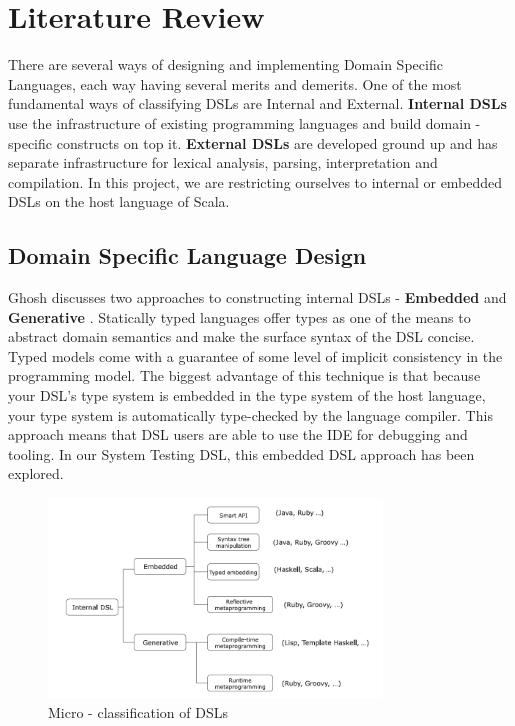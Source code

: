 \documentclass[12 pt]{article}
\begin{document}
\newpage
\section{Literature Review}
There are several ways of designing and implementing Domain Specific Languages, each way having several merits and demerits. One of the most fundamental ways of classifying DSLs are Internal and External. \textbf{Internal DSLs} use the infrastructure of existing programming languages and build domain - specific constructs on top it. \textbf{External DSLs} are developed ground up and has separate infrastructure for lexical analysis, parsing, interpretation and compilation. In this project, we are restricting ourselves to internal or embedded DSLs on the host language of Scala.
\bigskip

\subsection{Domain Specific Language Design}
Ghosh discusses two approaches to constructing internal DSLs - \textbf{Embedded} and \textbf{Generative} \cite{dslsInAction}. Statically typed languages offer types as one of the means to abstract domain semantics and make the surface syntax of the DSL concise. Typed models come with a
guarantee of some level of implicit consistency in the programming model. The biggest advantage of this technique is that because your DSL’s type system is embedded in the type system of the host language, your type system is automatically type-checked by the language compiler. This approach means that DSL users are able to use the IDE for debugging and tooling. In our System Testing DSL, this embedded DSL approach has been explored.
\bigskip

\begin{figure}[h!]
  \centering
    \includegraphics[height=200px]{figures/classification.png}
  \caption{Micro - classification of DSLs}
\end{figure}
\end{document}
